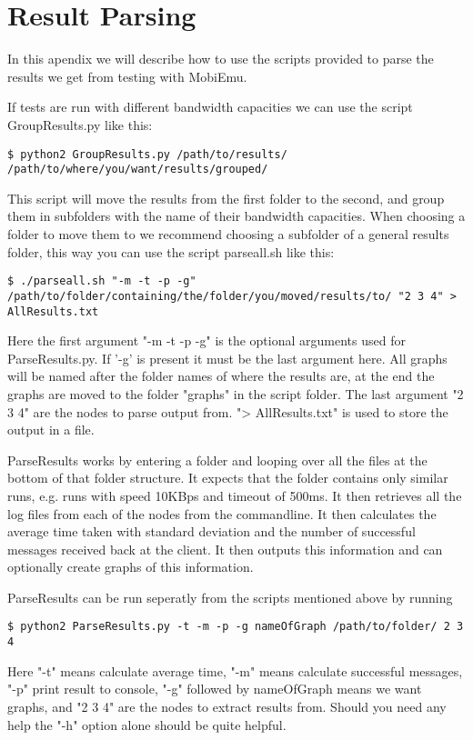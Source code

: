 \section{Result Parsing}\label{Result Parsing}
    In this apendix we will describe how to use the scripts provided to parse the results we get from testing with MobiEmu.
    
    If tests are run with different bandwidth capacities we can use the script GroupResults.py like this:
    \lstset{language=bash, style=shell}
    \begin{lstlisting}
$ python2 GroupResults.py /path/to/results/ /path/to/where/you/want/results/grouped/
    \end{lstlisting}
    This script will move the results from the first folder to the second, and group them in subfolders with the name of their bandwidth capacities. When choosing a folder to move them to we recommend choosing a subfolder of a general results folder, this way you can use the script parseall.sh like this:
    \begin{lstlisting}
$ ./parseall.sh "-m -t -p -g" /path/to/folder/containing/the/folder/you/moved/results/to/ "2 3 4" > AllResults.txt
    \end{lstlisting}
    Here the first argument "-m -t -p -g" is the optional arguments used for ParseResults.py. If '-g' is present it must be the last argument here. All graphs will be named after the folder names of where the results are, at the end the graphs are moved to the folder "graphs" in the script folder. The last argument "2 3 4" are the nodes to parse output from. "> AllResults.txt" is used to store the output in a file.
    
    ParseResults works by entering a folder and looping over all the files at the bottom of that folder structure. It expects that the folder contains only similar runs, e.g. runs with speed 10KBps and timeout of 500ms. It then retrieves all the log files from each of the nodes from the commandline. It then calculates the average time taken with standard deviation and the number of successful messages received back at the client. It then outputs this information and can optionally create graphs of this information.
    
    ParseResults can be run seperatly from the scripts mentioned above by running
    \begin{lstlisting}
$ python2 ParseResults.py -t -m -p -g nameOfGraph /path/to/folder/ 2 3 4
    \end{lstlisting}
    Here "-t" means calculate average time, "-m" means calculate successful messages, "-p" print result to console, "-g" followed by nameOfGraph means we want graphs, and "2 3 4" are the nodes to extract results from. Should you need any help the "-h" option alone should be quite helpful.
